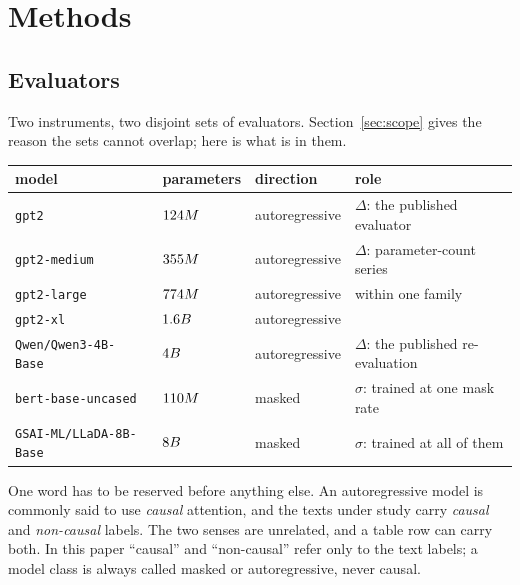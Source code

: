 \documentclass[11pt]{article}
\begin{document}
\section{Methods}
\label{sec:methods}

\subsection{Evaluators}
Two instruments, two disjoint sets of evaluators.  Section~\ref{sec:scope}
gives the reason the sets cannot overlap; here is what is in them.
\begin{center}
\begin{tabular}{llll}
\toprule
model & parameters & direction & role \\
\midrule
\texttt{gpt2}~\cite{gpt2}                 & $124M$ & autoregressive & $\Delta$: the published evaluator \\
\texttt{gpt2-medium}~\cite{gpt2}          & $355M$ & autoregressive & $\Delta$: parameter-count series \\
\texttt{gpt2-large}~\cite{gpt2}           & $774M$ & autoregressive & \quad within one family \\
\texttt{gpt2-xl}~\cite{gpt2}              & $1.6B$ & autoregressive & \\
\texttt{Qwen/Qwen3-4B-Base}~\cite{qwen3}   & $4B$ & autoregressive & $\Delta$: the published re-evaluation \\
\addlinespace
\texttt{bert-base-uncased}~\cite{bert}    & $110M$ & masked & $\sigma$: trained at one mask rate \\
\texttt{GSAI-ML/LLaDA-8B-Base}~\cite{llada} & $8B$   & masked & $\sigma$: trained at all of them \\
\bottomrule
\end{tabular}
\end{center}

One word has to be reserved before anything else.  An autoregressive model is
commonly said to use \emph{causal} attention, and the texts under study carry
\emph{causal} and \emph{non-causal} labels.  The two senses are unrelated, and
a table row can carry both.  In this paper ``causal'' and ``non-causal'' refer
only to the text labels; a model class is always called masked or
autoregressive, never causal.
\end{document}
